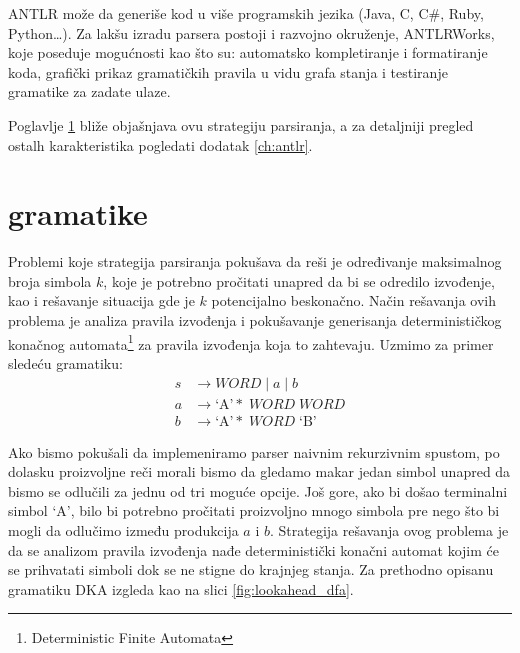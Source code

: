   
ANTLR može da generiše kod u više programskih jezika (Java, C, C\#, Ruby, Python\ldots). 
Za lakšu izradu parsera postoji i razvojno okruženje, ANTLRWorks, koje poseduje mogućnosti kao što su: 
automatsko kompletiranje i formatiranje koda, grafički prikaz gramatičkih pravila u vidu grafa stanja i testiranje gramatike za zadate ulaze.

Poglavlje \ref{sec:lla-gram} bliže objašnjava ovu strategiju parsiranja, a za detaljniji pregled ostalh karakteristika pogledati dodatak \ref{ch:antlr}.

\section{\LLa gramatike}
\label{sec:lla-gram}

Problemi koje \LLa strategija parsiranja pokušava da reši je određivanje maksimalnog broja simbola $k$, koje je potrebno pročitati unapred da bi se odredilo izvođenje, kao i rešavanje situacija gde je $k$ potencijalno beskonačno. 
Način rešavanja ovih problema je analiza pravila izvođenja i pokušavanje generisanja determinističkog konačnog automata\footnote{\eng Deterministic Finite Automata} za pravila izvođenja koja to zahtevaju.
Uzmimo za primer sledeću gramatiku:
\begin{align*}
    s &\rightarrow WORD \; | \; a \; | \; b \\
    a &\rightarrow \text{`A'}\ast \; WORD \; WORD \\
    b &\rightarrow \text{`A'}\ast \; WORD \; \text{`B'}
\end{align*}

Ako bismo pokušali da implemeniramo parser naivnim rekurzivnim spustom, po dolasku proizvoljne reči morali bismo da gledamo makar jedan simbol unapred da bismo se odlučili za jednu od tri moguće opcije.
Još gore, ako bi došao terminalni simbol `A', bilo bi potrebno pročitati proizvoljno mnogo simbola pre nego što bi mogli da odlučimo između produkcija $a$ i $b$.
Strategija rešavanja ovog problema je da se analizom pravila izvođenja nađe deterministički konačni automat kojim će se prihvatati simboli dok se ne stigne do krajnjeg stanja.
Za prethodno opisanu gramatiku DKA izgleda kao na slici \ref{fig:lookahead_dfa}.


